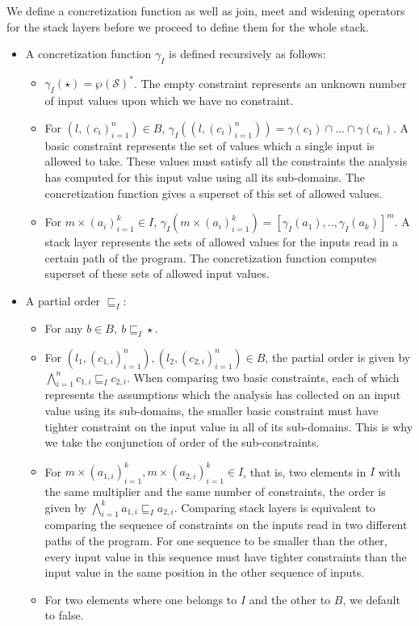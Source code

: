 \documentclass[10pt]{report}
\begin{document}
We define a concretization function as well as join, meet and widening operators for the stack layers before we proceed to define them for the whole stack. 

\begin{itemize}
	\item A concretization function $ \gamma_{I} $ is defined recursively as follows:
		\begin{itemize}
			\item $ \gamma_{I}(\star) = \wp(\mathcal{S})^{*}$. The empty constraint represents an unknown number of input values upon which we have no constraint. 
			
			\item For $ (l, (c_{i})_{i=1}^{n}) \in B $, $ \gamma_{I}((l, (c_{i})_{i=1}^{n})) = \gamma(c_{1}) \cap ... \cap\gamma(c_{n}) $. A basic constraint represents the set of values which a single input is allowed to take. These values must satisfy all the constraints the analysis has computed for this input value using all its sub-domains. The concretization function gives a superset of this set of allowed values.
			
			\item For $ m \times (a_{i})_{i=1}^{k} \in I $, $ \gamma_{I}(m \times (a_{i})_{i=1}^{k}) = [\gamma_{I}(a_{1}),.., \gamma_{I}(a_{k})]^{m}$. A stack layer represents the sets of allowed values for the inputs read in a certain path of the program. The concretization function computes superset of these sets of allowed input values. 
			 
		\end{itemize}
	\item A partial order $ \sqsubseteq_{I} $:
	\begin{itemize}
		\item For any $ b \in B,\ b \sqsubseteq_{I} \star$. 
		\item For $(l_{1}, (c_{1,i})_{i=1}^{n}), (l_{2}, (c_{2,i})_{i=1}^{n}) \in B$, the partial order is given by $ \bigwedge\limits_{i=1}^{n} c_{1,i} \sqsubseteq_{I} c_{2,i} $. When comparing two basic constraints, each of which represents the assumptions which the analysis has collected on an input value using its sub-domains, the smaller basic constraint must have tighter constraint on the input value in all of its sub-domains. This is why we take the conjunction of order of the sub-constraints. 
		\item For $ m \times (a_{1,i})_{i=1}^{k}, m \times (a_{2,i})_{i=1}^{k}  \in I$, that is, two elements in $ I $ with the same multiplier and the same number of constraints, the order is given by $ \bigwedge\limits_{i=1}^{k}a_{1,i} \sqsubseteq_{I} a_{2,i} $. Comparing stack layers is equivalent to comparing the sequence of constraints on the inputs read in two different paths of the program. For one sequence to be smaller than the other, every input value in this sequence must have tighter constraints than the input value in the same position in the other sequence of inputs. 
		\item For two elements where one belongs to $ I $ and the other to $ B $, we default to false. 
	\end{itemize}
	

\end{itemize}
\end{document}
